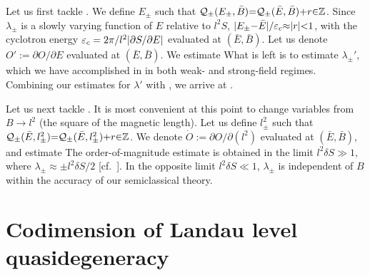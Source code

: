 \documentclass[aps, prb, showpacs, twocolumn, notitlepage, superscriptaddress]{revtex4-1}
\begin{document}
Let us first tackle . We define $E_{\pm}$ such that ${\cal Q}_{\pm}(E_{\pm},\bar{B}){=}{\cal Q}_{\pm}(\bar{E},\bar{B}){+}r{\in} \mathbb{Z}$. Since  $\lambda_{\pm}$ is a slowly varying function of $E$ relative to $l^2S$, $|E_{\pm}{-}\bar{E}|/\varepsilon_c{\approx} |r|{<}1$, with the cyclotron energy $\varepsilon_c=2\pi/l^2|\partial S/\partial E|$ evaluated at $(\bar{E},\bar{B})$. Let us denote $O':=\partial O/\partial E$ evaluated at $(\bar{E},\bar{B})$. We estimate
What is left is to estimate $\lambda_{\pm}'$, which we have accomplished in  in both weak- and strong-field regimes. Combining our estimates for $\lambda'$ with , we  arrive at .


Let us next tackle . It is most convenient at this point to change variables from $B\rightarrow l^2$ (the square of the magnetic length). Let us  define   $l^2_{\pm}$ such that ${\cal Q}_{\pm}(\bar{E},l^2_{\pm}){=}{\cal Q}_{\pm}(\bar{E},l^2_{\pm}){+}r{\in} \mathbb{Z}$. We denote  $\dot{O}:=\partial O/\partial(l^2)$ evaluated at $(\bar{E},\bar{B})$, and estimate
The order-of-magnitude estimate is obtained in the limit $l^2\delta S \gg 1$, where $\lambda_{\pm}\approx \pm l^2\delta S/2$ [cf.\ ]. In the opposite limit $l^2\delta S \ll 1$, $\lambda_{\pm}$ is independent of $B$ within the accuracy of our semiclassical theory.    

\section{Codimension of Landau level quasidegeneracy}\label{app:codimension}
\end{document}
